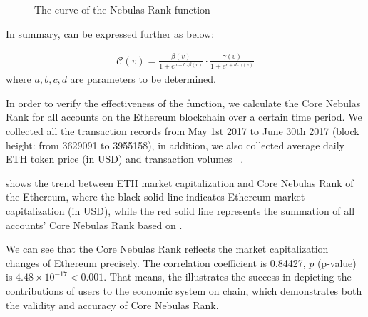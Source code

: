 \begin{figure}
\centering
{}
\caption{The curve of the Nebulas Rank function \label{fig-nr}}
\end{figure}


\vspace{2em}
In summary,  can be expressed further as below:

\begin{align}
\label{eq:rank-param}
\mathcal{C}(v) =  \frac{\beta(v)}{1+e^{a + b \cdot \beta(v)}} \cdot \frac{\gamma(v)}{1+e^{c + d \cdot \gamma(v)}}
\end{align}
\noindent where $a, b, c, d$ are parameters to be determined.


In order to verify the effectiveness of the function, we calculate the Core Nebulas Rank for all accounts on the Ethereum blockchain over a certain time period. We collected all the transaction records from May 1st 2017 to June 30th 2017 (block height: from 3629091 to 3955158), in addition, we also collected average daily ETH token price (in USD) and transaction volumes ~\cite{coinmarketcap}.

 shows the trend between ETH market capitalization and
Core Nebulas Rank of the Ethereum, where the black solid line indicates
Ethereum market capitalization (in USD), while the red solid line represents
the summation of all accounts' Core Nebulas Rank based on .

We can see that the Core Nebulas Rank reflects the market capitalization
changes of Ethereum precisely. The correlation coefficient is 0.84427, $p$
(p-value) is $4.48\times{}10^{-17}<0.001$. That means, the  illustrates the success in depicting the contributions of users to the economic system on chain, which demonstrates both the validity and accuracy of Core Nebulas Rank.


